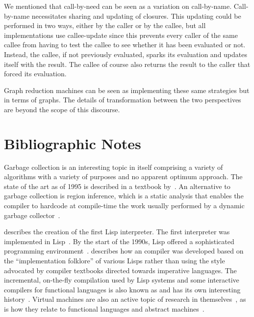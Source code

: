 We mentioned that call-by-need can be seen as a variation on call-by-name. Call-by-name necessitates sharing and updating of closures. This updating could be performed in two ways, either by the caller or by the callee, but all implementations use callee-update since this prevents every caller of the same callee from having to test the callee to see whether it has been evaluated or not. Instead, the callee, if not previously evaluated, sparks its evaluation and updates itself with the result. The callee of course also returns the result to the caller that forced its evaluation.

Graph reduction machines can be seen as implementing these same strategies but in terms of graphs. The details of transformation between the two perspectives are beyond the scope of this discourse.

\section{Bibliographic Notes}
Garbage collection is an interesting topic in itself comprising a variety of algorithms with a variety of purposes and no apparent optimum approach. The state of the art as of 1995 is described in a textbook by~\citet{Jones:Garbage:1996}. An alternative to garbage collection is region inference, which is a static analysis that enables the compiler to hardcode at compile-time the work usually performed by a dynamic garbage collector~\citep{Tofte:A-region:1998}.

 describes the creation of the first Lisp interpreter. The first \ML interpreter was implemented in Lisp~\citep[see][footnote~5]{Gordon:From:2000}. By the start of the 1990s, Lisp offered a sophisticated programming environment~\citep{Layer:Lisp:1991}.  describes how an  compiler was developed based on the ``implementation folklore'' of various Lisps rather than using the style advocated by compiler textbooks directed towards imperative languages. The incremental, on-the-fly compilation used by Lisp systems and some interactive compilers for functional languages is also known as  and has its own interesting history~\citep{Aycock:A-brief:2003}. Virtual machines are also an active topic of research in themselves~\citep{Shi:Virtual:2008}, as is how they relate to functional languages and abstract machines~\citep{Danvy:A-journey:2003,Ager:A-functional:2003,Ager:A-Functional:2003a,Ager:A-Functional:2004,Ager:From:2003}.


